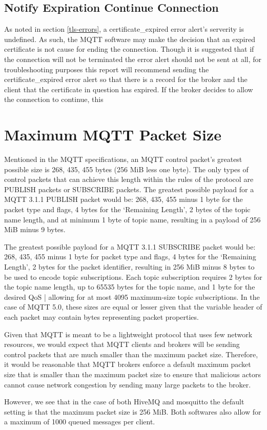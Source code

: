 \documentclass[12pt]{article}
\begin{document}
\subsection{Notify Expiration Continue Connection}
As noted in section \ref{tls-errors}, a certificate\_expired error alert's serverity is undefined. As such, the MQTT software may make the decision that an expired certificate is not cause for ending the connection. Though it is suggested that if the connection will not be terminated the error alert should not be sent at all, for troubleshooting purposes this report will recommend sending the certificate\_expired error alert so that there is a record for the broker and the client that the certificate in question has expired. If the broker decides to allow the connection to continue, this 

\section{Maximum MQTT Packet Size}
Mentioned in the MQTT specifications, an MQTT control packet's greatest possible size is 268, 435, 455 bytes (256 MiB less one byte). The only types of control packets that can achieve this length within the rules of the protocol are PUBLISH packets or SUBSCRIBE packets. The greatest possible payload for a MQTT 3.1.1 PUBLISH packet would be: 268, 435, 455 minus 1 byte for the packet type and flags, 4 bytes for the `Remaining Length', 2 bytes of the topic name length, and at minimum 1 byte of topic name, resulting in a payload of 256 MiB minus 9 bytes.\par
The greatest possible payload for a MQTT 3.1.1 SUBSCRIBE packet would be: 268, 435, 455 minus 1 byte for packet type and flags, 4 bytes for the `Remaining Length', 2 bytes for the packet identifier, resulting in 256 MiB minus 8 bytes to be used to encode topic subscriptions. Each topic subscription requires 2 bytes for the topic name length, up to 65535 bytes for the topic name, and 1 byte for the desired QoS | allowing for at most 4095 maximum-size topic subscriptions. In the case of MQTT 5.0, these sizes are equal or lesser given that the variable header of each packet may contain bytes representing packet properties.\par
Given that MQTT is meant to be a lightweight protocol that uses few network resources, we would expect that MQTT clients and brokers will be sending control packets that are much smaller than the maximum packet size. Therefore, it would be reasonable that MQTT brokers enforce a default maximum packet size that is smaller than the maximum packet size to ensure that malicious actors cannot cause network congestion by sending many large packets to the broker. \par
However, we see that in the case of both HiveMQ and mosquitto the default setting is that the maximum packet size is 256 MiB. Both softwares also allow for a maximum of 1000 queued messages per client. 
\end{document}
